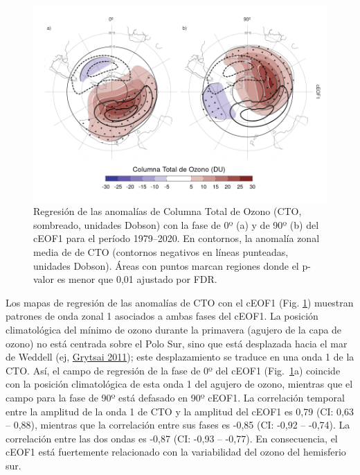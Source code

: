 \documentclass[12pt,oneside,a4paper]{reedthesis}
\begin{document}
\begin{figure}

{\centering \includegraphics{figures/20-ceofs/o3-regr-1} 

}

\caption{Regresión de las anomalías de Columna Total de Ozono (CTO, sombreado, unidades Dobson) con la fase de 0º (a) y de 90º (b) del cEOF1 para el período 1979--2020. En contornos, la anomalía zonal media de de CTO (contornos negativos en líneas punteadas, unidades Dobson). Áreas con puntos marcan regiones donde el p-valor es menor que 0,01 ajustado por FDR.}\label{fig:o3-regr}
\end{figure}



Los mapas de regresión de las anomalías de CTO con el cEOF1 (Fig. \ref{fig:o3-regr}) muestran patrones de onda zonal 1 asociados a ambas fases del cEOF1.
La posición climatológica del mínimo de ozono durante la primavera (agujero de la capa de ozono) no está centrada sobre el Polo Sur, sino que está desplazada hacia el mar de Weddell (ej, \protect\hyperlink{ref-grytsai2011}{Grytsai 2011}); este desplazamiento se traduce en una onda 1 de la CTO.
Así, el campo de regresión de la fase de 0º del cEOF1 (Fig.~\ref{fig:o3-regr}a) coincide con la posición climatológica de esta onda 1 del agujero de ozono, mientras que el campo para la fase de 90º está defasado en 90º cEOF1.
La correlación temporal entre la amplitud de la onda 1 de CTO y la amplitud del cEOF1 es 0,79 (CI: 0,63 -- 0,88), mientras que la correlación entre sus fases es -0,85 (CI: -0,92 -- -0,74).
La correlación entre las dos ondas es -0,87 (CI: -0,93 -- -0,77).
En consecuencia, el cEOF1 está fuertemente relacionado con la variabilidad del ozono del hemisferio sur.
\end{document}
